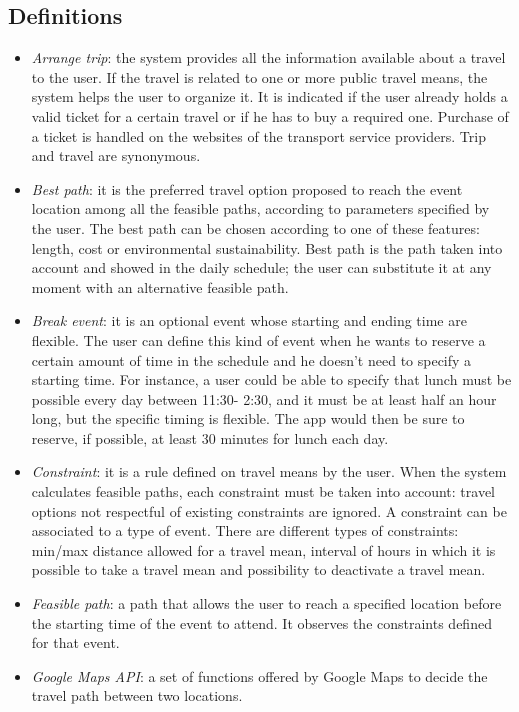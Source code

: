 \subsection{Definitions}
	\begin{itemize}
	\item \textit{Arrange trip}: the system provides all the information available about a travel to the user. If the travel is related to one or more public travel means, the system helps the user to organize it. It is indicated if the user already holds a valid ticket for a certain travel or if he has to buy a required one. Purchase of a ticket is handled on the websites of the transport service providers. Trip and travel are synonymous.
	\item \textit{Best path}: it is the preferred travel option proposed to reach the event location among all the feasible paths, according to parameters specified by the user. The best path can be chosen according to one of these features: length, cost or environmental sustainability. Best path is the path taken into account and showed in the daily schedule; the user can substitute it at any moment with an alternative feasible path. 
	\item \textit{Break event}: it is an optional event whose starting and ending time are flexible. The user can define this kind of event when he wants to reserve a certain amount of time in the schedule and he doesn't need to specify a starting time. For instance, a user could be able to specify that lunch must be possible every day between 11:30-
2:30, and it must be at least half an hour long, but the specific timing is flexible. The app would then be sure to reserve, if possible, at least 30 minutes for lunch each day.
	\item \textit{Constraint}: it is a rule defined on travel means by the user. When the system calculates feasible paths, each constraint must be taken into account: travel options not respectful of existing constraints are ignored. A constraint can be associated to a type of event. 
	\newline
	There are different types of constraints: min/max distance allowed for a travel mean, interval of hours in which it is possible to take a travel mean and possibility to deactivate a travel mean. 
	\item \textit{Feasible path}: a path that allows the user to reach a specified location before the starting time of the event to attend. It observes the constraints defined for that event.
	\item \textit{Google Maps API}: a set of functions offered by Google Maps to decide the travel path between two locations.

\end{itemize}
